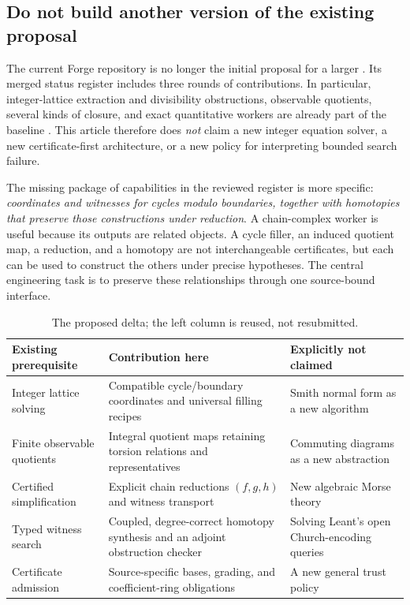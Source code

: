 \documentclass[11pt,letterpaper]{article}
\theoremstyle{definition}\newtheorem{definition}[theorem]{Definition}
\theoremstyle{remark}\newtheorem{remark}[theorem]{Remark}
\newcommand{\code}[1]{\texttt{\detokenize{#1}}}
\begin{document}
\subsection{Do not build another version of the existing proposal}
The current Forge repository is no longer the initial proposal for a larger
\code{grind}. Its merged status register includes three rounds of contributions.
In particular, integer-lattice extraction and divisibility obstructions,
observable quotients, several kinds of closure, and exact quantitative workers
are already part of the baseline \cite{forge-status,forge-conclusion}.
This article therefore does \emph{not} claim a new integer equation solver,
a new certificate-first architecture, or a new policy for interpreting bounded
search failure.

The missing package of capabilities in the reviewed register is more specific:
\emph{coordinates and witnesses for cycles modulo boundaries, together with
homotopies that preserve those constructions under reduction}. A chain-complex
worker is useful because its outputs are related objects. A cycle filler, an
induced quotient map, a reduction, and a homotopy are not interchangeable
certificates, but each can be used to construct the others under precise
hypotheses. The central engineering task is to preserve these relationships
through one source-bound interface.

\begin{table}[ht]
\centering\small
\begin{tabularx}{\textwidth}{@{}p{}XX@{}}
\toprule
Existing prerequisite & Contribution here & Explicitly not claimed\\
\midrule
Integer lattice solving & Compatible cycle/boundary coordinates and universal
filling recipes & Smith normal form as a new algorithm\\
Finite observable quotients & Integral quotient maps retaining torsion relations
and representatives & Commuting diagrams as a new abstraction\\
Certified simplification & Explicit chain reductions $(f,g,h)$ and witness
transport & New algebraic Morse theory\\
Typed witness search & Coupled, degree-correct homotopy synthesis and an adjoint
obstruction checker & Solving Leant's open Church-encoding queries\\
Certificate admission & Source-specific bases, grading, and coefficient-ring
obligations & A new general trust policy\\
\bottomrule
\end{tabularx}
\caption{The proposed delta; the left column is reused, not resubmitted.}
\end{table}
\end{document}
